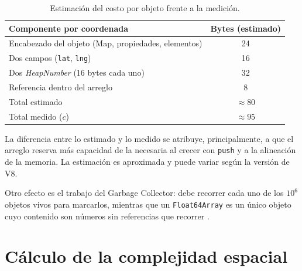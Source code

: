 \documentclass[11pt]{article}
\newcommand{\cObj}{95}            %
\begin{document}
\begin{table}[H]
    \centering\small
    \begin{tabular}{@{}lc@{}}
    \toprule
        \textbf{Componente por coordenada} & \textbf{Bytes (estimado)} \\
    \midrule
        Encabezado del objeto (Map, propiedades, elementos) & 24 \\
        Dos campos (\texttt{lat}, \texttt{lng}) & 16 \\
        Dos \textit{HeapNumber} (16 bytes cada uno) & 32 \\
        Referencia dentro del arreglo & 8 \\
    \midrule
        Total estimado & $\approx 80$ \\
        Total medido ($c$) & $\approx \cObj$ \\
    \bottomrule
    \end{tabular}
    \caption{Estimación del costo por objeto frente a la medición.}
    \label{tab:estimacion}
\end{table}

La diferencia entre lo estimado y lo medido se atribuye, principalmente, a que el arreglo reserva más capacidad de la necesaria al crecer con \texttt{push} y a la alineación de la memoria. La estimación es aproximada y puede variar según la versión de V8.

Otro efecto es el trabajo del Garbage Collector: debe recorrer cada uno de los $10^6$ objetos vivos para marcarlos, mientras que un \texttt{Float64Array} es un único objeto cuyo contenido son números sin referencias que recorrer \parencite{mdnmemory,nodememory}.

\section{Cálculo de la complejidad espacial}
\end{document}
